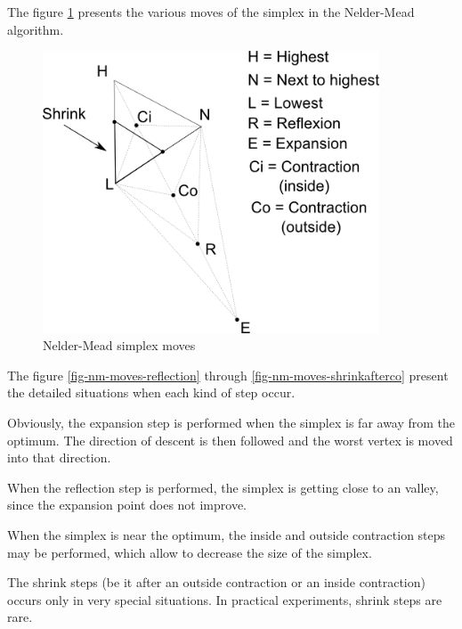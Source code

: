 The figure \ref{fig-nm-moves} presents the various moves of the 
simplex in the Nelder-Mead algorithm.

\begin{figure}
\begin{center}
\includegraphics[width=10cm]{nelder-mead-steps.png}
\end{center}
\caption{Nelder-Mead simplex moves}
\label{fig-nm-moves}
\end{figure}

The figure \ref{fig-nm-moves-reflection} 
through \ref{fig-nm-moves-shrinkafterco} present the 
detailed situations when each kind of step occur.
 
Obviously, the expansion step is performed when the 
simplex is far away from the optimum. The direction of 
descent is then followed and the worst vertex is moved 
into that direction.

When the reflection step is performed, the simplex is 
getting close to an valley, since the expansion point 
does not improve.

When the simplex is near the optimum, 
the inside and outside contraction steps may be performed, which 
allow to decrease the size of the simplex.

The shrink steps (be it after an outside contraction or an inside 
contraction) occurs only in very special situations. In practical experiments,
shrink steps are rare.

